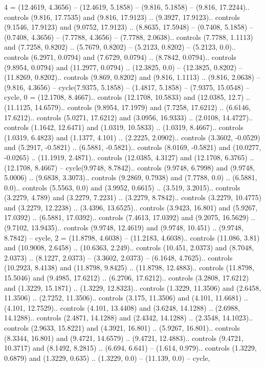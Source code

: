 {4} = {(12.4619, 4.3656) -- (12.4619, 5.1858) -- (9.816, 5.1858) -- (9.816, 17.2244).. controls (9.816, 17.7535) and (9.816, 17.9123) .. (9.3927, 17.9123).. controls (9.1546, 17.9123) and (9.0752, 17.9123) .. (8.8635, 17.5948) -- (0.7408, 5.1858) -- (0.7408, 4.3656) -- (7.7788, 4.3656) -- (7.7788, 2.0638).. controls (7.7788, 1.1113) and (7.7258, 0.8202) .. (5.7679, 0.8202) -- (5.2123, 0.8202) -- (5.2123, 0.0).. controls (6.2971, 0.0794) and (7.6729, 0.0794) .. (8.7842, 0.0794).. controls (9.8954, 0.0794) and (11.2977, 0.0794) .. (12.3825, 0.0) -- (12.3825, 0.8202) -- (11.8269, 0.8202).. controls (9.869, 0.8202) and (9.816, 1.1113) .. (9.816, 2.0638) -- (9.816, 4.3656) -- cycle(7.9375, 5.1858) -- (1.4817, 5.1858) -- (7.9375, 15.0548) -- cycle},
{0} = {(12.1708, 8.4667).. controls (12.1708, 10.5833) and (12.0385, 12.7) .. (11.1125, 14.6579).. controls (9.8954, 17.1979) and (7.7258, 17.6212) .. (6.6146, 17.6212).. controls (5.0271, 17.6212) and (3.0956, 16.9333) .. (2.0108, 14.4727).. controls (1.1642, 12.6471) and (1.0319, 10.5833) .. (1.0319, 8.4667).. controls (1.0319, 6.4823) and (1.1377, 4.101) .. (2.2225, 2.0902).. controls (3.3602, -0.0529) and (5.2917, -0.5821) .. (6.5881, -0.5821).. controls (8.0169, -0.5821) and (10.0277, -0.0265) .. (11.1919, 2.4871).. controls (12.0385, 4.3127) and (12.1708, 6.3765) .. (12.1708, 8.4667) -- cycle(9.9748, 8.7842).. controls (9.9748, 6.7998) and (9.9748, 5.0006) .. (9.6838, 3.3073).. controls (9.2869, 0.7938) and (7.7788, 0.0) .. (6.5881, 0.0).. controls (5.5563, 0.0) and (3.9952, 0.6615) .. (3.519, 3.2015).. controls (3.2279, 4.789) and (3.2279, 7.2231) .. (3.2279, 8.7842).. controls (3.2279, 10.4775) and (3.2279, 12.2238) .. (3.4396, 13.6525).. controls (3.9423, 16.801) and (5.9267, 17.0392) .. (6.5881, 17.0392).. controls (7.4613, 17.0392) and (9.2075, 16.5629) .. (9.7102, 13.9435).. controls (9.9748, 12.4619) and (9.9748, 10.451) .. (9.9748, 8.7842) -- cycle},
{2} = {(11.8798, 4.6038) -- (11.2183, 4.6038).. controls (11.086, 3.81) and (10.9008, 2.6458) .. (10.6363, 2.249).. controls (10.451, 2.0373) and (8.7048, 2.0373) .. (8.1227, 2.0373) -- (3.3602, 2.0373) -- (6.1648, 4.7625).. controls (10.2923, 8.4138) and (11.8798, 9.8425) .. (11.8798, 12.4883).. controls (11.8798, 15.5046) and (9.4985, 17.6212) .. (6.2706, 17.6212).. controls (3.2808, 17.6212) and (1.3229, 15.1871) .. (1.3229, 12.8323).. controls (1.3229, 11.3506) and (2.6458, 11.3506) .. (2.7252, 11.3506).. controls (3.175, 11.3506) and (4.101, 11.6681) .. (4.101, 12.7529).. controls (4.101, 13.4408) and (3.6248, 14.1288) .. (2.6988, 14.1288).. controls (2.4871, 14.1288) and (2.4342, 14.1288) .. (2.3548, 14.1023).. controls (2.9633, 15.8221) and (4.3921, 16.801) .. (5.9267, 16.801).. controls (8.3344, 16.801) and (9.4721, 14.6579) .. (9.4721, 12.4883).. controls (9.4721, 10.3717) and (8.1492, 8.2815) .. (6.694, 6.641) -- (1.614, 0.979).. controls (1.3229, 0.6879) and (1.3229, 0.635) .. (1.3229, 0.0) -- (11.139, 0.0) -- cycle},
